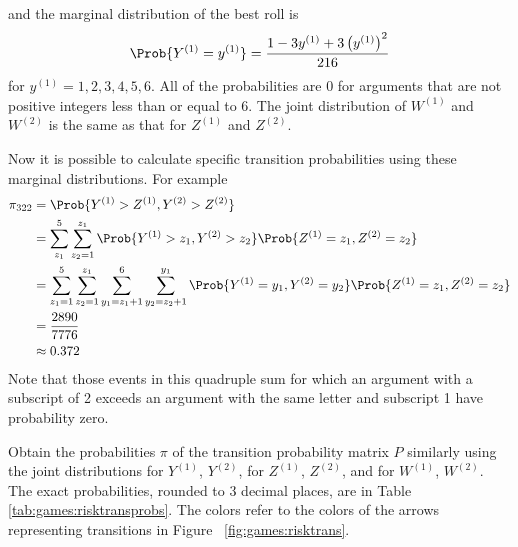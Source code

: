 \documentclass[12pt]{article}
\begin{document}
and the marginal distribution of the best roll is
\[
    \Prob{Y^{(1)} = y^{(1)}} = \frac{1 - 3y^{(1)} + 3 \left( y^{(1)}
    \right)^2}{216}
\] for \( y^{(1)} = 1,2,3,4,5,6 \).  All of the probabilities are \( 0 \)
for arguments that are not positive integers less than or equal to \( 6 \).
The joint distribution of \( W^{(1)} \) and \( W^{(2)} \) is the same as
that for \( Z^{(1)} \) and \( Z^{(2)} \).

Now it is possible to calculate specific transition probabilities using
these marginal distributions.  For example
\begin{align*}
    \pi_{322}   &= \Prob{Y^{(1)} > Z^{(1)}, Y^{(2)} > Z^{(2)}} \\
        &= \sum\limits_{z_1}^5 \sum\limits_{z_2=1}^{z_1} \Prob{Y^{(1)} >
    z_1, Y^{(2)} > z_2} \Prob{Z^{(1)} = z_1, Z^{(2)} = z_2} \\
        &= \sum\limits_{z_1=1}^5 \sum\limits_{z_2=1}^{z_1} \sum\limits_{y_1
    = z_1+1}^6 \sum\limits_{y_2 = z_2+1}^{y_1} \Prob{Y^{(1)} = y_1, Y^{(2)}
    = y_2} \Prob{Z^{(1)} = z_1, Z^{(2)} = z_2} \\
        &= \frac{2890}{7776} \\
        &\approx 0.372
\end{align*}
Note that those events in this quadruple sum for which an argument with
a subscript of 2 exceeds an argument with the same letter and subscript
1 have probability zero.

Obtain the probabilities \( \pi \) of the transition probability matrix \(
P \) similarly using the joint distributions for \( Y^{(1)} \), \( Y^{(2)}
\), for \( Z^{(1)} \), \( Z^{(2)} \), and for \( W^{(1)} \), \( W^{(2)} \).
The exact probabilities, rounded to \( 3 \) decimal places, are in
Table~%
\ref{tab:games:risktransprobs}.  The colors refer to the colors of the
arrows representing transitions in Figure~%
\ref{fig:games:risktrans}.
\end{document}
